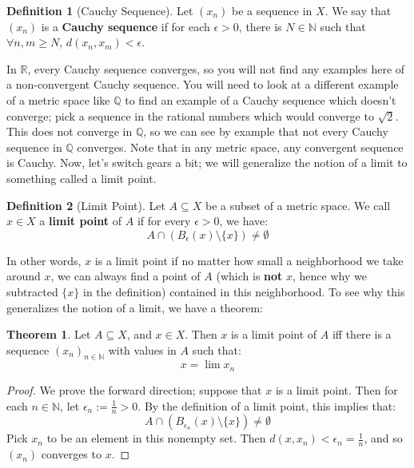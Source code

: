 \documentclass[11pt, oneside]{amsart}   	%
\theoremstyle{definition}
\newtheorem{definition}{Definition}[section]
\newtheorem{theorem}{Theorem}[section]
\begin{document}
	\begin{definition}[Cauchy Sequence]
		Let $(x_n)$ be a sequence in $X$. We say that $(x_n)$ is a \textbf{Cauchy sequence} if for each $\epsilon > 0$, there is $N\in\mathbb N$ such that 
		$\forall n, m\geq N$, $d(x_n, x_m) < \epsilon$.
	\end{definition}
	
	In $\mathbb R$, every Cauchy sequence converges, so you will not find any examples here of a non-convergent Cauchy sequence. 
	You will need to look at a different example of a metric space like $\mathbb Q$ to find an example of a Cauchy sequence which doesn't converge; pick a 
	sequence in the rational numbers which would converge to $\sqrt{2}$. This does not converge in $\mathbb Q$, so we can see by example that not every 
	Cauchy sequence in $\mathbb Q$ converges. Note that in any metric space, any convergent sequence is Cauchy. Now, let's switch gears a bit; we will generalize 
	the notion of a limit to something called a limit point.
	
	\begin{definition}[Limit Point]
		Let $A\subseteq X$ be a subset of a metric space. We call $x\in X$ a \textbf{limit point} of $A$ if for every $\epsilon > 0$, we have:
		$$
			A\cap(B_\epsilon(x)\setminus\{x\})\neq\emptyset
		$$
	\end{definition}
	
	In other words, $x$ is a limit point if no matter how small a neighborhood we take around $x$, we can always find a point of $A$ (which is \textbf{not} $x$, 
	hence why we subtracted $\{x\}$ in the definition) contained in this neighborhood. To see why this generalizes the notion of a limit, we have a theorem:
	
	\begin{theorem}
		Let $A\subseteq X$, and $x\in X$. Then $x$ is a limit point of $A$ iff there is a sequence $(x_n)_{n\in\mathbb N}$ with values in $A$ such that:
		$$
			x = \lim x_n
		$$
	\end{theorem}
	
	\begin{proof}
		We prove the forward direction; suppose that $x$ is a limit point. Then for each $n\in\mathbb N$, let $\epsilon_n := \frac{1}{n} > 0$. By the definition of 
		a limit point, this implies that:
		$$
			A\cap(B_{\epsilon_n}(x)\setminus\{x\})\neq\emptyset
		$$
		Pick $x_n$ to be an element in this nonempty set. Then $d(x, x_n) < \epsilon_n = \frac{1}{n}$, and so $(x_n)$ converges to $x$.
	\end{proof}
	
\end{document}
